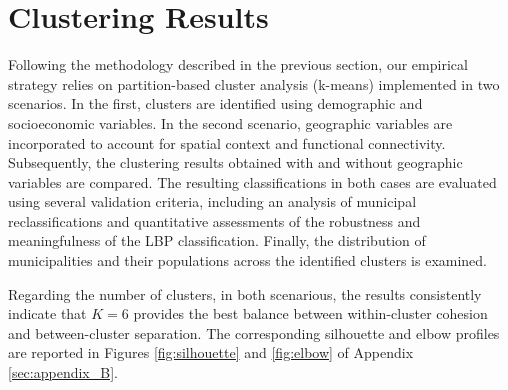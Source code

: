 \documentclass[a4paper,11pt,oneside]{article}
\begin{document}

\section{Clustering Results}
\label{sec:results}

Following the methodology described in the previous section, our empirical strategy relies on partition-based cluster analysis (k-means) implemented in two scenarios. In the first, clusters are identified using demographic and socioeconomic variables. In the second scenario, geographic variables are incorporated to account for spatial context and functional connectivity. Subsequently, the clustering results obtained with and without geographic variables are compared. The resulting classifications in both cases are evaluated using several validation criteria, including an analysis of municipal reclassifications and quantitative assessments of the robustness and meaningfulness of the LBP classification. Finally, the distribution of municipalities and their populations across the identified clusters is examined.


Regarding the number of clusters, in both scenarious, the results consistently indicate that $K=6$  provides the best balance between within-cluster cohesion and between-cluster separation. The corresponding silhouette and elbow profiles  are reported in Figures \ref{fig:silhouette} and \ref{fig:elbow} of Appendix \ref{sec:appendix_B}.
\end{document}
